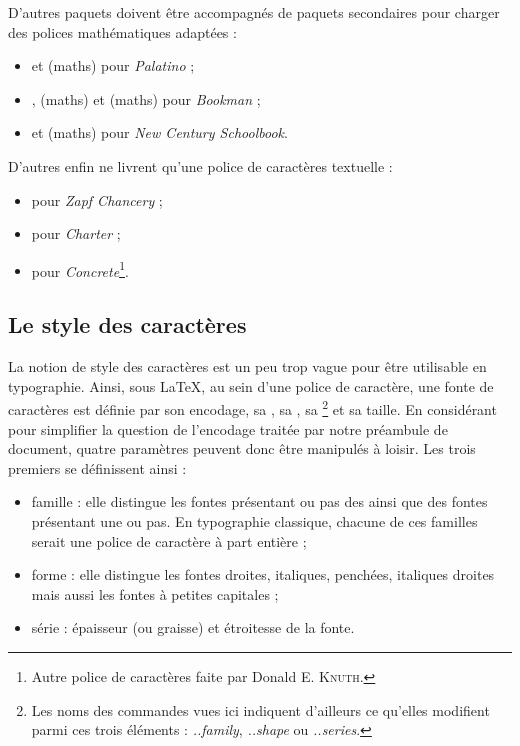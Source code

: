 D'autres paquets doivent être accompagnés de paquets secondaires pour charger des polices mathématiques adaptées :
\begin{itemize}
\item {} et  (maths) pour \emph{Palatino} ;
\item {},  (maths) et  (maths) pour \emph{Bookman} ;
\item {} et  (maths) pour \emph{New Century Schoolbook}. \\
\end{itemize}

D'autres enfin ne livrent qu'une police de caractères textuelle :
\begin{itemize}
\item {} pour \emph{Zapf Chancery} ;
\item {} pour \emph{Charter} ;
\item {} pour \emph{Concrete}\footnote{Autre police de caractères faite par Donald E. \textsc{Knuth}.}.
\end{itemize}


\subsection{Le style des caractères} %

La notion de style des caractères est un peu trop vague pour être utilisable en typographie. Ainsi, sous \LaTeX, au sein d'une police de caractère, une fonte de caractères est définie par son encodage, sa , sa , sa \footnote{Les noms des commandes vues ici indiquent d'ailleurs ce qu'elles modifient parmi ces trois éléments : \emph{..family}, \emph{..shape} ou \emph{..series}.} et sa taille. En considérant pour simplifier la question de l'encodage traitée par notre préambule de document, quatre paramètres peuvent donc être manipulés à loisir. Les trois premiers se définissent ainsi :
\begin{itemize}
\item famille : elle distingue les fontes présentant ou pas des  ainsi que des fontes présentant une  ou pas. En typographie classique, chacune de ces familles serait une police de caractère à part entière ;
\item forme : elle distingue les fontes droites, italiques, penchées, italiques droites mais aussi les fontes à petites capitales ;
\item série : épaisseur (ou graisse) et étroitesse de la fonte.
\end{itemize}

